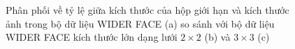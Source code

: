 {    \begin{figure}[H]
        \centering
        \caption{Phân phối về tỷ lệ giữa kích thước của hộp giới hạn và kích thước ảnh trong bộ dữ liệu WIDER FACE \cite{yang2016wider} (a) so sánh với bộ dữ liệu WIDER FACE kích thước lớn dạng lưới $2 \times 2$ (b) và $3 \times 3$ (c)}
        \label{fig:widerface_4k_scale}
    \end{figure}

}
